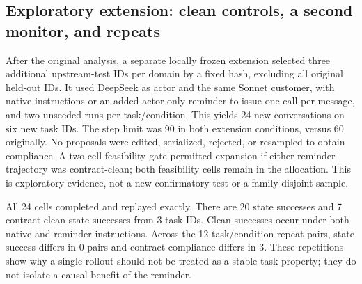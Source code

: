 \subsection{Exploratory extension: clean controls, a second monitor, and repeats}
\label{sec:extension}
After the original analysis, a separate locally frozen extension selected three additional upstream-test IDs per domain by a fixed hash, excluding all original held-out IDs. It used DeepSeek as actor and the same Sonnet customer, with native instructions or an added actor-only reminder to issue one call per message, and two unseeded runs per task/condition. This yields 24 new conversations on six new task IDs. The step limit was 90 in both extension conditions, versus 60 originally. No proposals were edited, serialized, rejected, or resampled to obtain compliance. A two-cell feasibility gate permitted expansion if either reminder trajectory was contract-clean; both feasibility cells remain in the allocation. This is exploratory evidence, not a new confirmatory test or a family-disjoint sample.

All 24 cells completed and replayed exactly. There are 20 state successes and 7 contract-clean state successes from 3 task IDs. Clean successes occur under both native and reminder instructions. Across the 12 task/condition repeat pairs, state success differs in 0 pairs and contract compliance differs in 3. These repetitions show why a single rollout should not be treated as a stable task property; they do not isolate a causal benefit of the reminder.

